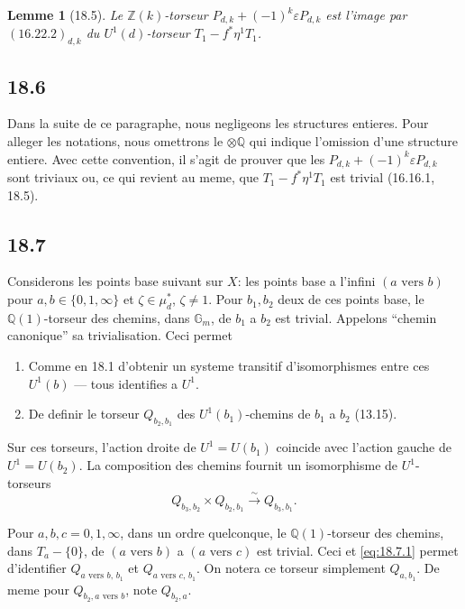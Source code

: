 \documentclass[12pt,a4paper]{article}
\theoremstyle{plain}
\newtheorem{lemma}[theorem]{Lemme}
\theoremstyle{definition}
\theoremstyle{remark}
\newcommand{\Gm}{\mathbb{G}_m}
\newcommand{\ZZ}{\mathbb{Z}}
\newcommand{\QQ}{\mathbb{Q}}
\begin{document}
\begin{lemma}[18.5]\label{lem:18.5}
Le $\ZZ(k)$-torseur $P_{d,k} + (-1)^k \varepsilon P_{d,k}$ est l'image
par $(16.22.2)_{d,k}$ du $U^1(d)$-torseur $T_1 - f^*\eta^1 T_1$.
\end{lemma}

\subsection{18.6}

Dans la suite de ce paragraphe, nous negligeons les structures
entieres. Pour alleger les notations, nous omettrons le $\otimes \QQ$
qui indique l'omission d'une structure entiere. Avec cette
convention, il s'agit de prouver que les
$P_{d,k} + (-1)^k \varepsilon P_{d,k}$ sont triviaux ou, ce qui revient
au meme, que $T_1 - f^*\eta^1 T_1$ est trivial (16.16.1, 18.5).

\subsection{18.7}

Considerons les points base suivant sur $X$: les points base a
l'infini $(a \text{ vers } b)$ pour $a, b \in \{0, 1, \infty\}$ et
$\zeta \in \mu_d^*$, $\zeta \neq 1$. Pour $b_1, b_2$ deux de ces points
base, le $\QQ(1)$-torseur des chemins, dans $\Gm$, de $b_1$ a $b_2$
est trivial. Appelons ``chemin canonique'' sa trivialisation. Ceci
permet
\begin{enumerate}
\item[(a)] Comme en 18.1 d'obtenir un systeme transitif
d'isomorphismes entre ces $U^1(b)$ --- tous identifies a $U^1$.
\item[(b)] De definir le torseur $Q_{b_2,b_1}$ des
$U^1(b_1)$-chemins de $b_1$ a $b_2$ (13.15).
\end{enumerate}

Sur ces torseurs, l'action droite de $U^1 = U(b_1)$ coincide avec
l'action gauche de $U^1 = U(b_2)$. La composition des chemins fournit
un isomorphisme de $U^1$-torseurs
\begin{equation}\label{eq:18.7.1}
Q_{b_3,b_2} \times Q_{b_2,b_1} \xrightarrow{\sim} Q_{b_3,b_1}.
\end{equation}

Pour $a, b, c = 0, 1, \infty$, dans un ordre quelconque, le
$\QQ(1)$-torseur des chemins, dans $T_a - \{0\}$, de
$(a \text{ vers } b)$ a $(a \text{ vers } c)$ est trivial. Ceci et
\eqref{eq:18.7.1} permet d'identifier
$Q_{a \text{ vers } b,\, b_1}$ et $Q_{a \text{ vers } c,\, b_1}$. On
notera ce torseur simplement $Q_{a,b_1}$. De meme pour
$Q_{b_2, a \text{ vers } b}$, note $Q_{b_2,a}$.
\end{document}
